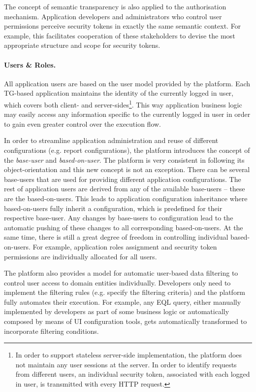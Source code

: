   The concept of semantic transparency is also applied to the authorisation mechanism.
  Application developers and administrators who control user permissions perceive security tokens in exactly the same semantic context.
  For example, this facilitates cooperation of these stakeholders to devise the most appropriate structure and scope for security tokens.

  \paragraph{Users \& Roles.} 
  All application users are based on the user model provided by the platform.
  Each TG-based application maintains the identity of the currently logged in user, which covers both client- and server-sides\footnote{
    In order to support stateless server-side implementation, the platform does not maintain any user sessions at the server. 
    In order to identify requests from different users, an individual security token, associated with each logged in user, is transmitted with every HTTP request.}.
  This way application business logic may easily access any information specific to the currently logged in user in order to gain even greater control over the  execution flow.
  
  In order to streamline application administration and reuse of different configurations (e.g. report configurations), the platform introduces the concept of the \emph{base-user} and \emph{based-on-user}.
  The platform is very consistent in following its object-orientation and this new concept is not an exception.
  There can be several base-users that are used for providing different application configurations.
  The rest of application users are derived from any of the available base-users -- these are the based-on-users.
  This leads to application configuration inheritance where based-on-users fully inherit a configuration, which is predefined for their respective base-user.
  Any changes by base-users to configuration lead to the automatic pushing of these changes to all corresponding based-on-users.
  At the same time, there is still a great degree of freedom in controlling individual based-on-users.
  For example, application roles assignment and security token permissions are individually allocated for all users.
  
  The platform also provides a model for automatic user-based data filtering to control user access to domain entities individually.
  Developers only need to implement the filtering rules (e.g. specify the filtering criteria) and the platform fully automates their execution.
  For example, any EQL query, either manually implemented by developers as part of some business logic or automatically composed by means of UI configuration tools, gets automatically transformed to incorporate filtering conditions.

